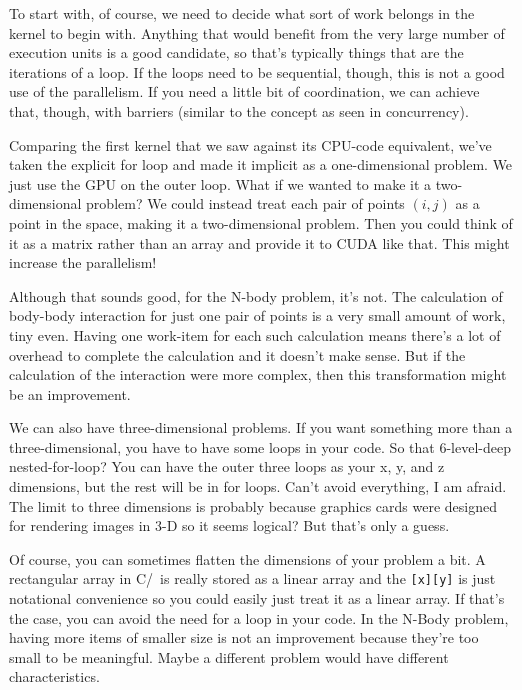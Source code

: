 To start with, of course, we need to decide what sort of work belongs in the kernel to begin with. Anything that would benefit from the very large number of execution units is a good candidate, so that's typically things that are the iterations of a loop. If the loops need to be sequential, though, this is not a good use of the parallelism. If you need a little bit of coordination, we can achieve that, though, with barriers (similar to the concept as seen in concurrency). 

Comparing the first kernel that we saw against its CPU-code equivalent, we've taken the explicit for loop and made it implicit as a one-dimensional problem. We just use the GPU on the outer loop. What if we wanted to make it a two-dimensional problem? We could instead treat each pair of points $(i, j)$ as a point in the space, making it a two-dimensional problem. Then you could think of it as a matrix rather than an array and provide it to CUDA like that. This might increase the parallelism! 

Although that sounds good, for the N-body problem, it's not. The calculation of body-body interaction for just one pair of points is a very small amount of work, tiny even. Having one work-item for each such calculation means there's a lot of overhead to complete the calculation and it doesn't make sense. But if the calculation of the interaction were more complex, then this transformation might be an improvement.

We can also have three-dimensional problems. If you want something more than a three-dimensional, you have to have some loops in your code. So that 6-level-deep nested-for-loop? You can have the outer three loops as your x, y, and z dimensions, but the rest will be in for loops. Can't avoid everything, I am afraid. The limit to three dimensions is probably because graphics cards were designed for rendering images in 3-D so it seems logical? But that's only a guess.

Of course, you can sometimes flatten the dimensions of your problem a bit. A rectangular array in C/\CPP~is really stored as a linear array and the \texttt{[x][y]} is just notational convenience so you could easily just treat it as a linear array. If that's the case, you can avoid the need for a loop in your code. In the N-Body problem, having more items of smaller size is not an improvement because they're too small to be meaningful. Maybe a different problem would have different characteristics.


